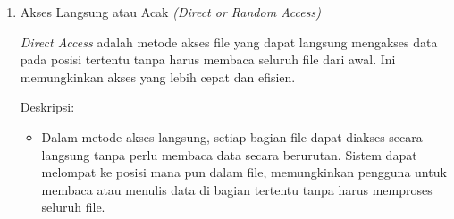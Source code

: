 \documentclass[12pt]{article}
\begin{document}
\begin{enumerate}
\begin{itemize}
    \end{itemize}

    {Kasus penggunaan:}
     \begin{itemize}
        \item Arsip

        \item Media file

        \item Sistem \textit{backup}: Penyimpanan data yang diakses atau dipulihkan secara berurutan.

    \end{itemize}

    {Kelebihan:}
     \begin{itemize}
        \item Sederhana: Metode ini mudah diimplementasikan dan ideal untuk penggunaan saat urutan data penting.


        \item Kinerja: Dapat memberikan kinerja yang baik untuk aplikasi yang membaca atau menulis seluruh file dari awal hingga akhir.
    \end{itemize}

    {Kekurangan:}
     \begin{itemize}
        \item Tidak Fleksibel: Untuk mengakses data di tengah file, seluruh bagian sebelumnya harus dilewati, membuat akses menjadi lambat untuk file besar.

        \item Tidak efisien: Untuk aplikasi yang memerlukan pengambilan data secara acak, metode ini tidak efisien.

    \end{itemize}

    
\item  Akses Langsung atau Acak \textit{(Direct or Random Access)}

\textit{Direct Access} adalah metode akses file yang dapat langsung mengakses data pada posisi tertentu tanpa harus membaca seluruh file dari awal. Ini memungkinkan akses yang lebih cepat dan efisien.

    {Deskripsi:}
    \begin{itemize}
        \item Dalam metode akses langsung, setiap bagian file dapat diakses secara langsung tanpa perlu membaca data secara berurutan. Sistem dapat melompat ke posisi mana pun dalam file, memungkinkan pengguna untuk membaca atau menulis data di bagian tertentu tanpa harus memproses seluruh file.


\end{itemize}
\end{enumerate}
\end{document}
